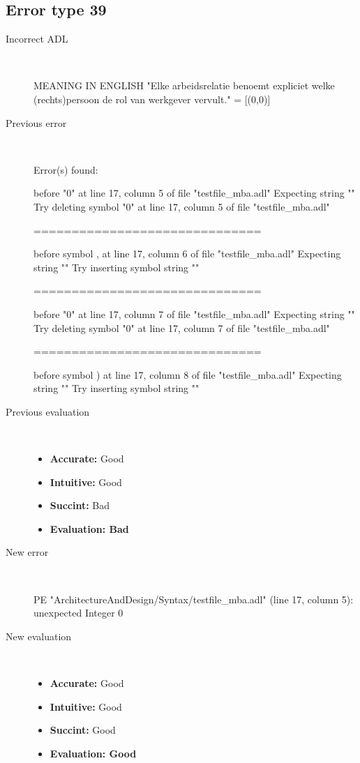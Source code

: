 \hrulefill

\subsection{Error type 39}
  \begin{description}
  \item[Incorrect ADL]~\\
\begin{adl}
MEANING IN ENGLISH "Elke arbeidsrelatie benoemt expliciet welke (rechts)persoon de rol van werkgever vervult."
= [(0,0)]\end{adl}
  \item[Previous error]~\\
\begin{haskell}
Error(s) found:

before "0" at line 17, column 5 of file "testfile_mba.adl"
Expecting string ""
Try deleting symbol "0" at line 17, column 5 of file "testfile_mba.adl"

==============================

before symbol , at line 17, column 6 of file "testfile_mba.adl"
Expecting string ""
Try inserting symbol string ""

==============================

before "0" at line 17, column 7 of file "testfile_mba.adl"
Expecting string ""
Try deleting symbol "0" at line 17, column 7 of file "testfile_mba.adl"

==============================

before symbol ) at line 17, column 8 of file "testfile_mba.adl"
Expecting string ""
Try inserting symbol string ""\end{haskell}
  \item[Previous evaluation]~\\
    \begin{itemize}
    \item \textbf{Accurate:} Good
    \item \textbf{Intuitive:} Good
    \item \textbf{Succint:} Bad
    \item \textbf{Evaluation: Bad}
    \end{itemize}
  \item[New error]~\\
\begin{haskell}
PE "ArchitectureAndDesign/Syntax/testfile_mba.adl" (line 17, column 5):
unexpected Integer 0\end{haskell}
  \item[New evaluation]~\\
    \begin{itemize}
    \item \textbf{Accurate:} Good
    \item \textbf{Intuitive:} Good
    \item \textbf{Succint:} Good
    \item \textbf{Evaluation: Good
}
    \end{itemize}
  \end{description}

